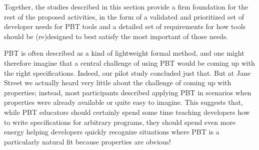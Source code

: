
\smallskip

Together, the studies described in this section provide a firm
foundation for the rest of the proposed
activities, in the form of a validated and prioritized set of developer
needs for PBT tools and a detailed set of requirements for how tools should be
(re)designed to best satisfy the most important of those needs.



%
%
PBT is often described as a kind of lightweight formal method, and one
might therefore imagine that a central challenge of using PBT would be
coming up with the
right specifications. Indeed, our pilot study concluded just that. But at
Jane Street we actually heard very little about the challenge of coming up with
properties; instead, most participants described applying PBT in scenarios when
properties were already available or quite easy to imagine. This suggests that,
while PBT educators should certainly spend some time teaching developers how to
write specifications for arbitrary programs, they should spend even more energy
helping developers quickly recognize  situations where PBT is a particularly
natural fit because properties are obvious!

